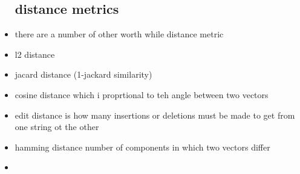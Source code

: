 \documentclass{article}
\begin{document}
\begin{itemize}
\subsection*{distance metrics}
\item there are a number of other worth while distance metric 
\item l2 distance 
\item jacard distance (1-jackard similarity)
\item cosine distance which i proprtional to teh angle between two vectors 
\item edit distance is how many insertions or deletions must be made to get from one string ot the other
\item hamming distance number of components in which two vectors differ
\item 
\end{itemize}
\end{document}
